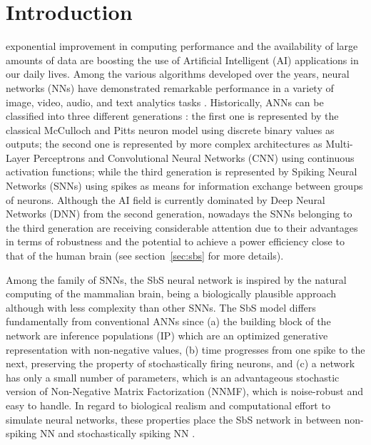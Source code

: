 
\section{Introduction}
\label{sec:introduction}
 exponential improvement in computing performance and the availability of large amounts of data are boosting the use of Artificial Intelligent (AI) applications in our daily lives. Among the various algorithms developed over the years, neural networks (NNs) have demonstrated remarkable performance in a variety of image, video, audio, and text analytics tasks \cite{schmidhuber2015deep,Taigman_2014_CVPR}. Historically, ANNs can be classified into three different generations \cite{Design_Exploration_SbS_Trans20}: the first one is represented by the classical McCulloch and Pitts neuron model using discrete binary values as outputs; the second one is represented by more complex architectures as Multi-Layer Perceptrons and Convolutional Neural Networks (CNN) using continuous activation functions; while the third generation is represented by Spiking Neural Networks (SNNs) using spikes as means for information exchange between groups of neurons. Although the AI field is currently dominated by Deep Neural Networks (DNN) from the second generation, nowadays the SNNs belonging to the third generation are receiving considerable attention \cite{Spinnaker_Trans13,ernst2007efficient,Design_Exploration_SbS_Trans20, SNN_Survey_Trans19} due to their advantages in terms of robustness and the
potential to achieve a power efficiency close to that of the human
brain (see section~\ref{sec:sbs} for more details).

Among the family of SNNs, the SbS neural network \cite{ernst2007efficient} is inspired by the natural computing of the mammalian brain, being a biologically plausible approach although with less complexity than other SNNs. The SbS model differs fundamentally from conventional ANNs since (a) the building block of the network are inference populations (IP) which are an optimized generative representation with non-negative values, (b) time progresses from one spike to the next, preserving the property of stochastically firing neurons, and (c) a network has only a small number of parameters, which is an advantageous stochastic version of Non-Negative Matrix Factorization (NNMF), which is noise-robust and easy to handle. In regard to biological realism and computational effort to simulate neural networks, these properties place the SbS network in between non-spiking NN and stochastically spiking NN \cite{rotermund2019Backpropagation}.


